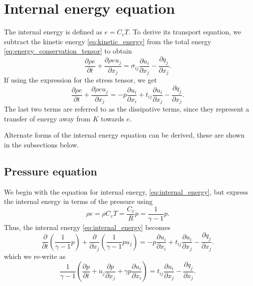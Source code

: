 \documentclass[oneside,a4paper,11pt]{report}
\begin{document}
\section{Internal energy equation}
\label{sec:alternate_forms_internal_energy_equation}
The internal energy is defined as $e = C_v T$. To derive its transport equation, we subtract the kinetic energy \cref{eq:kinetic_energy} from the total energy \cref{eq:energy_conservation_tensor} to obtain
\begin{equation}
    \label{eq:internal_energy_sigma}
    \frac{ \partial \rho e}{\partial t} + \frac{\partial \rho e u_j}{\partial x_j} = \sigma_{ij} \frac{\partial u_i}{\partial x_j} - \frac{\partial q_j}{\partial x_j}.
\end{equation}
If using the expression for the stress tensor, we get
\begin{equation}
    \label{eq:internal_energy}
    \frac{ \partial \rho e}{\partial t} + \frac{\partial \rho e u_j}{\partial x_j} = - p \frac{\partial u_i}{\partial x_i} + t_{ij} \frac{\partial u_i}{\partial x_j} - \frac{\partial q_j}{\partial x_j}.
\end{equation}
The last two terms are referred to as the dissipative terms, since they represent a transfer of energy away from $K$ towards $e$.

Alternate forms of the internal energy equation can be derived, these are shown in the subsections below.
\subsection{Pressure equation} 
We begin with the equation for internal energy, \cref{eq:internal_energy}, but express the internal energy in terms of the pressure using 
\begin{equation}
\rho e = \rho C_v T = \frac{C_v}{R} p = \frac{1}{\gamma - 1} p.
\end{equation}
Thus, the internal energy \cref{eq:internal_energy} becomes
\begin{equation}
\frac{ \partial}{\partial t} \left ( \frac{1}{\gamma - 1} p \right ) + \frac{\partial}{\partial x_j} \left ( \frac{1}{\gamma - 1} p u_j \right ) = - p \frac{\partial u_i}{\partial x_i} + t_{ij} \frac{\partial u_i}{\partial x_j} - \frac{\partial q_j}{\partial x_j}.
\end{equation}
which we re-write as
\begin{equation}
\label{eq:energy_form_pressure}
\frac{1}{\gamma - 1} \left ( \frac{ \partial p}{\partial t}  + u_j\frac{\partial p}{\partial x_j} + \gamma p \frac{\partial u_i}{\partial x_i} \right ) =  t_{ij} \frac{\partial u_i}{\partial x_j} - \frac{\partial q_j}{\partial x_j}.
\end{equation}
\end{document}
